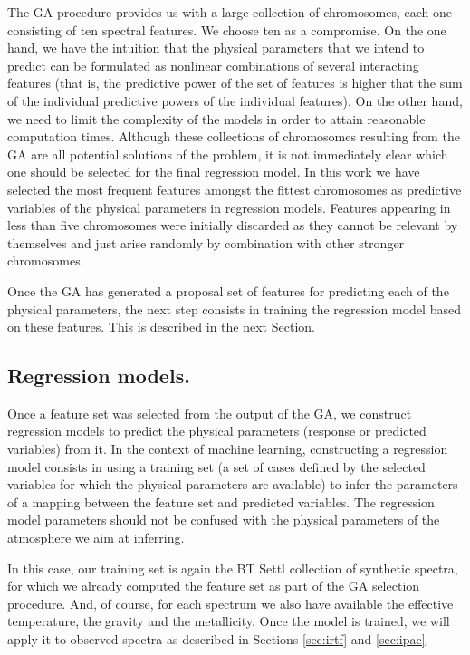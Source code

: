 The GA procedure provides us with a large collection of chromosomes,
each one consisting of ten spectral features. We choose ten as a
compromise. On the one hand, we have the intuition that the physical
parameters that we intend to predict can be formulated as nonlinear
combinations of several interacting features (that is, the predictive
power of the set of features is higher that the sum of the individual
predictive powers of the individual features). On the other hand, we
need to limit the complexity of the models in order to attain
reasonable computation times. Although these collections of
chromosomes resulting from the GA are all potential solutions of the
problem, it is not immediately clear which one should be selected for
the final regression model. In this work we have selected the most
frequent features amongst the fittest chromosomes as predictive
variables of the physical parameters in regression models. Features
appearing in less than five chromosomes were initially discarded as
they cannot be relevant by themselves and just arise randomly by
combination with other stronger chromosomes.

Once the GA has generated a proposal set of features for predicting
each of the physical parameters, the next step consists in training
the regression model based on these features. This is described in the
next Section.

\subsection{Regression models.}
\label {ssub:models}

Once a feature set was selected from the output of the GA, we
construct regression models to predict the physical parameters
(response or predicted variables) from it. In the context of machine
learning, constructing a regression model consists in using a training
set (a set of cases defined by the selected variables for which the
physical parameters are available) to infer the parameters of a
mapping between the feature set and predicted variables.  The
regression model parameters should not be confused with the physical
parameters of the atmosphere we aim at inferring.

In this case, our training set is again the BT Settl collection of
synthetic spectra, for which we already computed the 
feature set as part of the GA selection procedure. And,
of course, for each spectrum we also have available the effective
temperature, the gravity and the metallicity. Once the model is
trained, we will apply it to observed spectra as described in
Sections \ref{sec:irtf} and \ref{sec:ipac}.  

